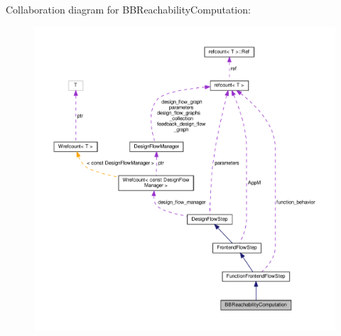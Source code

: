 Collaboration diagram for B\+B\+Reachability\+Computation\+:
\nopagebreak
\begin{figure}[H]
\begin{center}
\leavevmode
\includegraphics[width=350pt]{d4/d11/classBBReachabilityComputation__coll__graph}
\end{center}
\end{figure}
